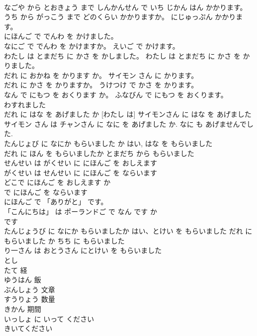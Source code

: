 \documentclass[8pt]{extreport}
\begin{document}
\begin{CJK}{UTF8}{min}
\\	なごや から とおきょう まで しんかんせん で いち じかん はん かかります。	
\\	うち から がっこう まで どのくらい かかりますか。 にじゅっぷん かかります。	
\\	にほんご で でんわ を かけました。	
\\	なにご で でんわ を かけますか。 えいご で かけます。	
\\	わたし は とまだち に かさ を かしました。 わたし は とまだち に かさ を かりました。	
\\	だれ に おかね を かります か。 サイモン さん に かります。	
\\	だれ に かさ を かりますか。 うけつけ で かさ を かります。	
\\	なん で にもつ を おくります か。 ふなびん で にもつ を おくります。	
\\	わすれました	
\\	だれ に はな を あげました か [わたし は] サイモンさん に はな を あげました	
\\	サイモン さん は チャンさん に なに を あげました か. なに も あげませんでした.	
\\	たんじょび に なにか もらいました か はい, はな を もらいました	
\\	だれ に ほん を もらいましたか とまだち から もらいました	
\\	せんせい は がくせい に にほんご を おしえます	
\\	がくせい は せんせい に にほんご を ならいます	
\\	どこで にほんご を おしえます か 
\\	で にほんご を ならいます	
\\	にほんご で 「ありがと」 です。
\\	「こんにちは」 は ポーランドご で なん です か 
\\	です	
\\	たんじょうび に なにか もらいましたか はい、とけい を もらいました だれ に もらいました か ちち に もらいました	
\\	り一さん は おとうさん にとけい を もらいました	
\\	とし	
\\	たて	経
\\	ゆうはん	飯
\\	ぶんしょう	文章
\\	すうりょう	数量
\\	きかん	期間
\\	いっしょ に いって ください	
\\	きいてください	

\end{CJK}
\end{document}
